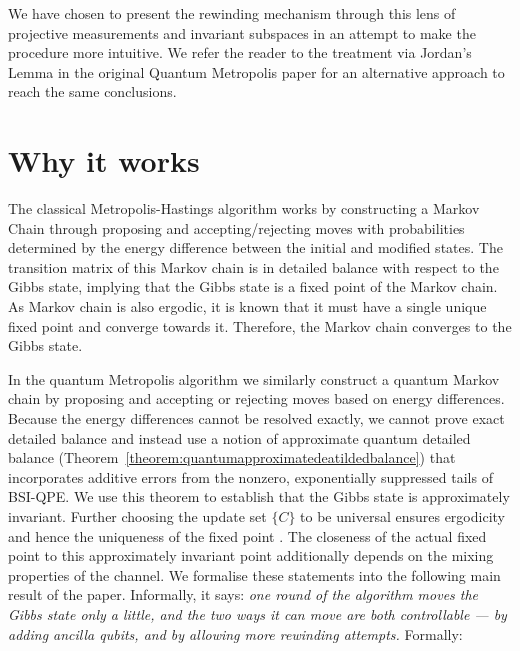 \documentclass[aps,floatfix,10pt,amssymb,amsfont,amsmath,superscriptaddress,float,nofootinbib,longbibliography,nobalancelastpage,twocolumn]{revtex4-2}
\begin{document}
We have chosen to present the rewinding mechanism through this lens of projective measurements and invariant subspaces in an attempt to make the procedure more intuitive. We refer the reader to the treatment via Jordan's Lemma in the original Quantum Metropolis paper \cite{Temme_2011} for an alternative approach to reach the same conclusions.
\label{section:rejection}

\section{Why it works}
\label{section:why}
The classical Metropolis-Hastings algorithm works by constructing a Markov Chain through proposing and accepting/rejecting moves with probabilities determined by the energy difference between the initial and modified states. The transition matrix of this Markov chain is in detailed balance with respect to the Gibbs state, implying that the Gibbs state is a fixed point of the Markov chain. As Markov chain is also ergodic, it is known that it must have a single unique fixed point and converge towards it. Therefore, the Markov chain converges to the Gibbs state.

In the quantum Metropolis algorithm we similarly construct a quantum Markov chain by proposing and accepting or rejecting moves based on energy differences. Because the energy differences cannot be resolved exactly, we cannot prove exact detailed balance and instead use a notion of approximate quantum detailed balance (Theorem~\ref{theorem:quantumapproximatedeatildedbalance}) that incorporates additive errors from the nonzero, exponentially suppressed tails of BSI-QPE. We use this theorem to establish that the Gibbs state is approximately invariant. Further choosing the update set $\{C\}$ to be universal ensures ergodicity and hence the uniqueness of the fixed point \cite{Temme_2011}. The closeness of the actual fixed point to this approximately invariant point additionally depends on the mixing properties of the channel. We formalise these statements into the following main result of the paper. Informally, it says: \emph{one round of the algorithm moves the Gibbs state only a little, and the two ways it can move are both controllable --- by adding ancilla qubits, and by allowing more rewinding attempts.} Formally:
\end{document}
